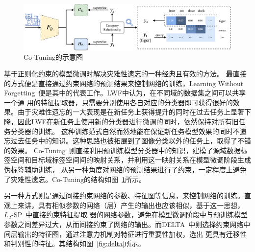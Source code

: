 \begin{figure}
    \centering
    \includegraphics[width=\linewidth]{figures/cotuning.pdf}
    \caption{Co-Tuning的示意图~\citep{you2020co}}
    \label{fig:cotuning}
\end{figure}

基于正则化约束的模型微调时解决灾难性遗忘的一种经典且有效的方法。
最直接的方式便是直接通过约束网络的预测结果来控制网络的训练，Learning Without Forgetting~\citep{li2017learning}便是其中的代表工作。LWF中认为，在不同域的数据集之间可以共享一个通
用的特征提取器，只需要分别使用各自对应的分类器即可获得很好的效果。由于灾难性遗忘的一大表现是在新任务上获得提升的同时在过去任务上显著下降，因此LWF在新任务上使用新的分类器进行微调的同时，依然保持对所有旧任务分类器的训练。
这种训练范式自然而然地能在保证新任务模型效果的同时不遗忘过去任务中的知识。这种思路也被拓展到了图像分类以外的任务上，取得了不错的效果。
Co-Tuning~\citep{you2020co}则直接利用预训练模型分类器中的知识，建模了源域数据标签空间和目标域标签空间间的映射关系，并利用这一映射关系在模型微调阶段生成伪标签辅助训练，
从另一种角度对网络的预测结果进行了约束，一定程度上避免了灾难性遗忘。Co-Tuning的结构如图~\ref{fig:cotuning}所示。

另一种方式则是通过间接约束网络的参数、特征图等信息，来控制网络的训练。直观上来讲，具有相似参数的网络（层）产生的输出也应该相似，基于这一思想，$L_2$-SP~\citep{xuhong2018explicit}中直接约束特征提取
器的网络参数，避免在模型微调阶段中与预训练模型参数之间差异过大，从而间接约束了网络的输出。而DELTA~\citep{li2018delta}中则选择约束网络中间层输出的特征图，通过注意力机制对特征进行重要性加权，选出
更具有迁移性和判别性的特征。其结构如图~\ref{fig:delta}所示。


